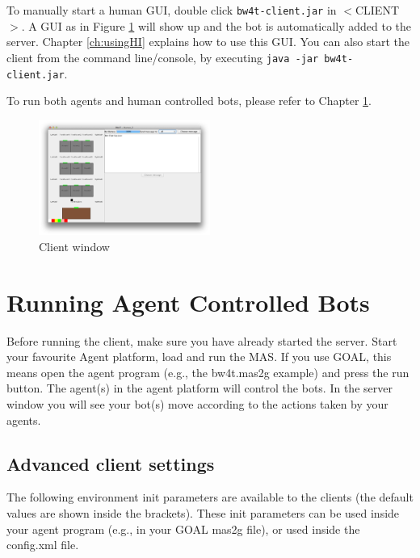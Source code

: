 \documentclass[11pt,a4paper]{article}
\begin{document}
To manually start a human GUI, double click \texttt{bw4t-client.jar} in $<$CLIENT$>$. A GUI as in Figure \ref{fig:Client} will show up and the bot is automatically added to the server. Chapter \ref{ch:usingHI} explains how to use this GUI. You can also start the client from the command line/console, by executing \texttt{java -jar bw4t-client.jar}.

To run both agents and human controlled bots, please refer to Chapter \ref{ch:runbots}.

\begin{figure}[!h]
\begin{center}
  \includegraphics[width=0.5\textwidth]{HumanPlayerGUI/hpg.png}
  \caption{Client window}\label{fig:Client}
\end{center}
\end{figure}


\section{Running Agent Controlled Bots}\label{ch:runbots}
Before running the client, make sure you have already started the server. Start your favourite Agent platform, load and run the MAS. If you use GOAL, this means open the agent program (e.g., the bw4t.mas2g example) and press the run button. The agent(s) in the agent platform will control the bots. In the server window you will see your bot(s) move according to the actions taken by your agents.

\subsection{Advanced client settings}\label{sec:clientsettings}
\label{sec:clientadvancedrunsettings}
The following environment init parameters are available to the clients (the default values are shown inside the brackets). These init parameters can be used inside your agent program (e.g., in your GOAL mas2g file), or used inside the config.xml file. 
\end{document}
